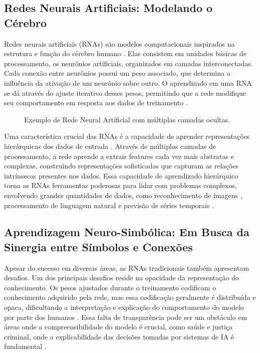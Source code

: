 \documentclass[12pt]{article}
\begin{document}
\subsection{Redes Neurais Artificiais: Modelando o Cérebro}

Redes neurais artificiais (RNAs) são modelos computacionais inspirados na estrutura e função do cérebro humano \cite{kohonen2012self}.  Elas consistem em unidades básicas de processamento,  os neurônios artificiais,  organizados em camadas interconectadas. Cada conexão entre neurônios possui um peso associado,  que determina a influência da ativação de um neurônio sobre outro. O aprendizado em uma RNA se dá através do ajuste iterativo desses pesos,  permitindo que a rede modifique seu comportamento em resposta aos dados de treinamento \cite{hinton2006reducing}.

\begin{figure}[h!]
\centering

\caption{Exemplo de Rede Neural Artificial com múltiplas camadas ocultas.}
\label{fig:rede_neural}
\end{figure}

Uma característica crucial das RNAs é a capacidade de aprender representações hierárquicas dos dados de entrada \cite{bengio2009learning}.  Através de múltiplas camadas de processamento,  a rede aprende a extrair features cada vez mais abstratas e complexas,  construindo representações sofisticadas que capturam as relações intrínsecas presentes nos dados. Essa capacidade de aprendizado hierárquico torna as RNAs ferramentas poderosas para lidar com problemas complexos,  envolvendo grandes quantidades de dados,  como reconhecimento de imagens \cite{krizhevsky2012imagenet},  processamento de linguagem natural \cite{collobert2008unified} e previsão de séries temporais \cite{hochreiter1997long}.

\subsection{Aprendizagem Neuro-Simbólica: Em Busca da Sinergia entre Símbolos e Conexões}

Apesar do sucesso em diversas áreas, as RNAs tradicionais também apresentam desafios.  Um dos principais desafios reside na opacidade da representação do conhecimento. Os pesos ajustados durante o treinamento codificam o conhecimento adquirido pela rede,  mas essa codificação geralmente é distribuída e opaca,  dificultando a interpretação e explicação do comportamento do modelo por parte dos humanos \cite{lipton2018mythos}.  Essa falta de transparência pode ser um obstáculo em áreas onde a compreensibilidade do modelo é crucial,  como saúde e justiça criminal,  onde a explicabilidade das decisões tomadas por sistemas de IA é fundamental \cite{doshi2017towards}.
\end{document}
